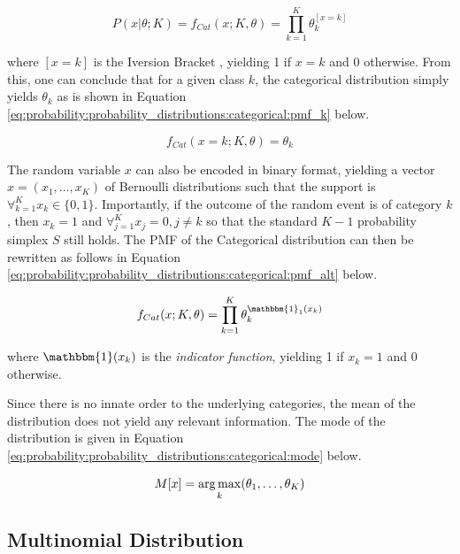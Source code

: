 \begin{equation}
    \label{eq:probability:probability_distributions:categorical:pmf}
    P(x \vert \theta; K) = f_{Cat}(x; K, \theta) = \prod_{k=1}^{K}\theta_{k}^{[x = k]}
\end{equation}

where $[x = k]$ is the Iversion Bracket \cite{ref:iverson:1962}, yielding 1 if $x = k$ and 0 otherwise. From this, one can conclude that for a given class $k$, the categorical distribution simply yields $\theta_{k}$ as is shown in Equation \ref{eq:probability:probability_distributions:categorical:pmf_k} below.  

\begin{equation}
    \label{eq:probability:probability_distributions:categorical:pmf_k}
    f_{Cat}(x=k; K, \theta) = \theta_{k}
\end{equation}

The random variable $x$ can also be encoded in binary format, yielding a vector $x = (x_{1}, \dots, x_{K})$ of Bernoulli distributions such that the support is $\forall_{k=1}^{K} x_{k} \in \{0, 1\}$. Importantly, if the outcome of the random event is of category $k$, then $x_{k} = 1$ and $\forall_{j=1}^{K} x_{j} = 0, j \neq k$ so that the standard $K-1$ probability simplex $S$ still holds. The \ac{PMF} of the Categorical distribution can then be rewritten as follows in Equation \ref{eq:probability:probability_distributions:categorical:pmf_alt} below.

\begin{equation}
    \label{eq:probability:probability_distributions:categorical:pmf_alt}
    f_{Cat}(x; K, \theta) = \prod_{k=1}^{K}\theta_{k}^{\mathbbm{1}_{1}(x_{k})}
\end{equation}

where $\mathbbm{1}(x_{k})$ is the \textit{indicator function}, yielding 1 if $x_{k} = 1$ and 0 otherwise.

Since there is no innate order to the underlying categories, the mean of the distribution does not yield any relevant information. The mode of the distribution is given in Equation \ref{eq:probability:probability_distributions:categorical:mode} below.

\begin{equation}
    \label{eq:probability:probability_distributions:categorical:mode}
    M[x] = \operatorname*{arg\,max}_{k}(\theta_{1}, \dots, \theta_{K})
\end{equation}


\subsection{Multinomial Distribution}
\label{sec:probability:probability_distributions:multinomial}

